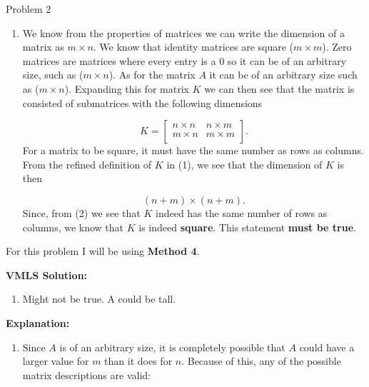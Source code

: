 \begin{problem}{Problem 2}
\begin{Highlight}
        \begin{enumerate}[label = (\alph*)]
            \item We know from the properties of matrices we can write the dimension of a matrix as $m \times n$. We know that identity matrices are square ($m \times m$). Zero matrices are matrices 
            where every entry is a 0 so it can be of an arbitrary size, such as ($m \times n$). As for the matrix $A$ it can be of an arbitrary size such as ($m \times n$). Expanding this for matrix $K$ 
            we can then see that the matrix is consisted of submatrices with the following dimensions

            \begin{equation}
                K = 
                \begin{bmatrix}
                    n \times n & n \times m \\
                    m \times n & m \times m \\
                \end{bmatrix}.
            \end{equation}
            For a matrix to be square, it must have the same number as rows as columns. From the refined definition of $K$ in (1), we see that the dimension of $K$ is then

            \begin{equation}
                (n + m) \times (n + m).
            \end{equation}
            Since, from (2) we see that $K$ indeed has the same number of rows as columns, we know that $K$ is indeed \textbf{square}. This statement \textbf{must be true}.
        \end{enumerate}
    \end{Highlight}

    \begin{Highlight}
        For this problem I will be using \textbf{Method 4}. \vspace*{1em}

        \noindent \textbf{VMLS Solution:}

        \begin{enumerate}[label = (\alph*), start = 2]
            \item Might not be true. A could be tall.
        \end{enumerate}

        \noindent \textbf{Explanation:}

        \begin{enumerate}[label = (\alph*), start = 2]
            \item Since $A$ is of an arbitrary size, it is completely possible that $A$ could have a larger value for $m$ than it does for $n$. Because of this, any of the possible
            matrix descriptions are valid:


\end{enumerate}
\end{Highlight}
\end{problem}
